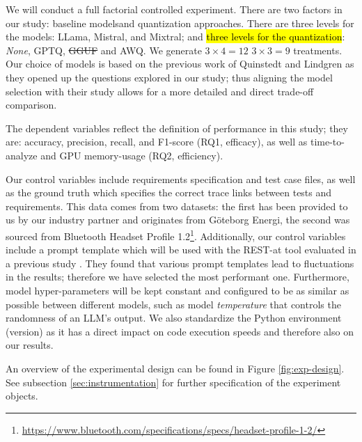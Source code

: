 \documentclass[conference]{IEEEtran}
\newcommand{\hly}[1]{\sethlcolor{yellow}\hl{#1}}
\begin{document}
We will conduct a full factorial controlled experiment. There are two factors in our study: baseline models and quantization approaches. There are three levels for the models: LLama, Mistral, and Mixtral; and \hly{three levels for the quantization}: \textit{None}, GPTQ, \st{GGUF} and AWQ. We generate \st{$3 \times 4 = 12$} $3 \times 3 = 9$ treatments. Our choice of models is based on the previous work of Quinstedt and Lindgren \cite{quinstedt2024Optimizing} as they opened up the questions explored in our study; thus aligning the model selection with their study allows for a more detailed and direct trade-off comparison.

The dependent variables reflect the definition of performance in this study; they are: accuracy, precision, recall, and F1-score (RQ1, efficacy), as well as time-to-analyze and GPU memory-usage (RQ2, efficiency).

Our control variables include requirements specification and test case files, as well as the ground truth which specifies the correct trace links between tests and requirements. This data comes from two datasets: the first has been provided to us by our industry partner and originates from G\"oteborg Energi, the second was sourced from Bluetooth Headset Profile 1.2\footnote{\url{https://www.bluetooth.com/specifications/specs/headset-profile-1-2/}}. Additionally, our control variables include a prompt template which will be used with the REST-at tool evaluated in a previous study \cite{quinstedt2024Optimizing}. They found that various prompt templates lead to fluctuations in the results; therefore we have selected the most performant one. Furthermore, model hyper-parameters will be kept constant and configured to be as similar as possible between different models, such as model \textit{temperature} that controls the randomness of an LLM's output. We also standardize the Python environment (version) as it has a direct impact on code execution speeds and therefore also on our results.

An overview of the experimental design can be found in Figure \ref{fig:exp-design}. See subsection \ref{sec:instrumentation} for further specification of the experiment objects.


\newcommand{\equalM}{$M_{1} = \dots = M_{12}$}
\newcommand{\notEqualM}{$M_{1} \neq \dots \neq M_{12}$}
\end{document}
